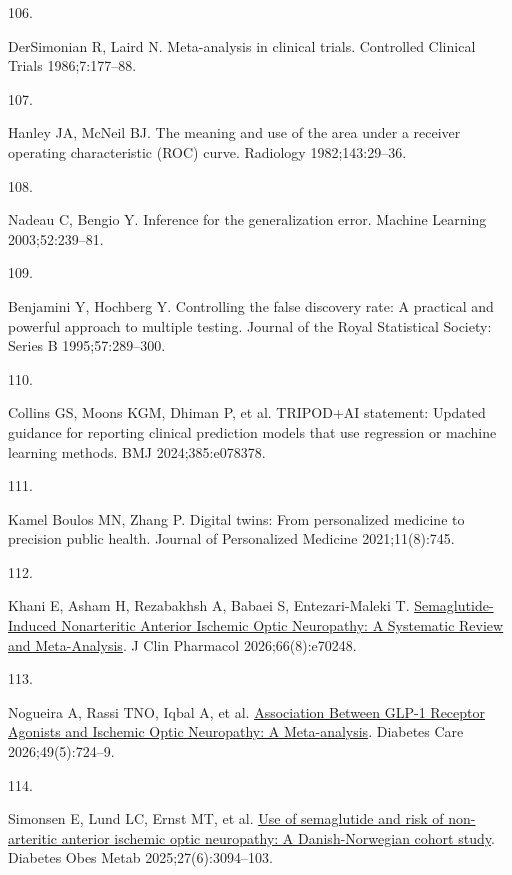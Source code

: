 \documentclass[
  11pt,
]{article}
\newlength{\cslhangindent}
\newlength{\csllabelwidth}
\newenvironment{CSLReferences}[2] %
 {\begin{list}{}{%
  \setlength{\itemindent}{0pt}
  \setlength{\leftmargin}{0pt}
  \setlength{\parsep}{0pt}
  \ifodd #1
   \setlength{\leftmargin}{\cslhangindent}
   \setlength{\itemindent}{-1\cslhangindent}
  \fi
  \setlength{\itemsep}{#2\baselineskip}}}
 {\end{list}}
\newcommand{\CSLLeftMargin}[1]{\parbox[t]{\csllabelwidth}{\strut#1\strut}}
\newcommand{\CSLRightInline}[1]{\parbox[t]{\linewidth - \csllabelwidth}{\strut#1\strut}}
\begin{document}
\begin{CSLReferences}{0}{1}
\CSLLeftMargin{106. }%
\CSLRightInline{DerSimonian R, Laird N. Meta-analysis in clinical
trials. Controlled Clinical Trials 1986;7:177--88. }

\CSLLeftMargin{107. }%
\CSLRightInline{Hanley JA, McNeil BJ. The meaning and use of the area
under a receiver operating characteristic (ROC) curve. Radiology
1982;143:29--36. }

\CSLLeftMargin{108. }%
\CSLRightInline{Nadeau C, Bengio Y. Inference for the generalization
error. Machine Learning 2003;52:239--81. }

\CSLLeftMargin{109. }%
\CSLRightInline{Benjamini Y, Hochberg Y. Controlling the false discovery
rate: A practical and powerful approach to multiple testing. Journal of
the Royal Statistical Society: Series B 1995;57:289--300. }

\CSLLeftMargin{110. }%
\CSLRightInline{Collins GS, Moons KGM, Dhiman P, et al. TRIPOD+AI
statement: Updated guidance for reporting clinical prediction models
that use regression or machine learning methods. BMJ 2024;385:e078378. }

\CSLLeftMargin{111. }%
\CSLRightInline{Kamel Boulos MN, Zhang P. Digital twins: From
personalized medicine to precision public health. Journal of
Personalized Medicine 2021;11(8):745. }

\CSLLeftMargin{112. }%
\CSLRightInline{Khani E, Asham H, Rezabakhsh A, Babaei S,
Entezari-Maleki T.
\href{https://doi.org/10.1002/jcph.70248}{{Semaglutide-Induced
Nonarteritic Anterior Ischemic Optic Neuropathy: A Systematic Review and
Meta-Analysis}}. J Clin Pharmacol 2026;66(8):e70248. }

\CSLLeftMargin{113. }%
\CSLRightInline{Nogueira A, Rassi TNO, Iqbal A, et al.
\href{https://doi.org/10.2337/dc25-1238}{{Association Between GLP-1
Receptor Agonists and Ischemic Optic Neuropathy: A Meta-analysis}}.
Diabetes Care 2026;49(5):724--9. }

\CSLLeftMargin{114. }%
\CSLRightInline{Simonsen E, Lund LC, Ernst MT, et al.
\href{https://doi.org/10.1111/dom.16316}{{Use of semaglutide and risk of
non-arteritic anterior ischemic optic neuropathy: A Danish-Norwegian
cohort study}}. Diabetes Obes Metab 2025;27(6):3094--103. }


\end{CSLReferences}
\end{document}
